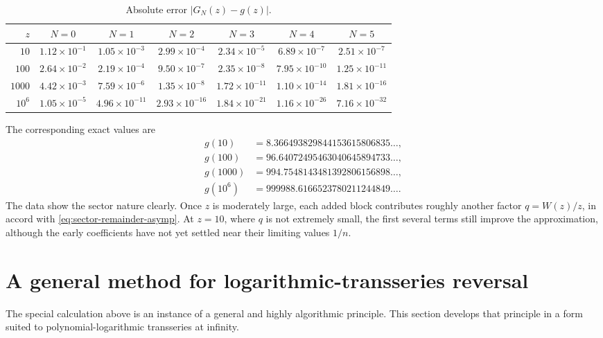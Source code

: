 \documentclass[11pt,a4paper]{article}
\numberwithin{equation}{section}
\theoremstyle{definition}
\theoremstyle{remark}
\begin{document}
\begin{table}[htbp]
\centering
\caption{Absolute error \(\lvert G_N(z)-g(z)\rvert\).}
\label{tab:numeric-errors}
\small
\begin{tabular}{rcccccc}
\toprule
\(z\) & \(N=0\) & \(N=1\) & \(N=2\) & \(N=3\) & \(N=4\) & \(N=5\)\\
\midrule
\(10\)
& \(1.12\times10^{-1}\) & \(1.05\times10^{-3}\) & \(2.99\times10^{-4}\)
& \(2.34\times10^{-5}\) & \(6.89\times10^{-7}\) & \(2.51\times10^{-7}\)\\
\(100\)
& \(2.64\times10^{-2}\) & \(2.19\times10^{-4}\) & \(9.50\times10^{-7}\)
& \(2.35\times10^{-8}\) & \(7.95\times10^{-10}\) & \(1.25\times10^{-11}\)\\
\(1000\)
& \(4.42\times10^{-3}\) & \(7.59\times10^{-6}\) & \(1.35\times10^{-8}\)
& \(1.72\times10^{-11}\) & \(1.10\times10^{-14}\) & \(1.81\times10^{-16}\)\\
\(10^6\)
& \(1.05\times10^{-5}\) & \(4.96\times10^{-11}\) & \(2.93\times10^{-16}\)
& \(1.84\times10^{-21}\) & \(1.16\times10^{-26}\) & \(7.16\times10^{-32}\)\\
\bottomrule
\end{tabular}
\end{table}

The corresponding exact values are
\begin{align*}
 g(10)&=8.366493829844153615806835\ldots,\\
 g(100)&=96.64072495463040645894733\ldots,\\
 g(1000)&=994.7548143481392806156898\ldots,\\
 g(10^6)&=999988.6166523780211244849\ldots.
\end{align*}
The data show the sector nature clearly.  Once \(z\) is moderately large,
each added block contributes roughly another factor \(q=W(z)/z\), in
accord with \eqref{eq:sector-remainder-asymp}.  At \(z=10\), where
\(q\) is not extremely small, the first several terms still improve the
approximation, although the early coefficients have not yet settled near
their limiting values \(1/n\).

\section{A general method for logarithmic-transseries reversal}

The special calculation above is an instance of a general and highly
algorithmic principle.  This section develops that principle in a form
suited to polynomial-logarithmic transseries at infinity.
\end{document}
